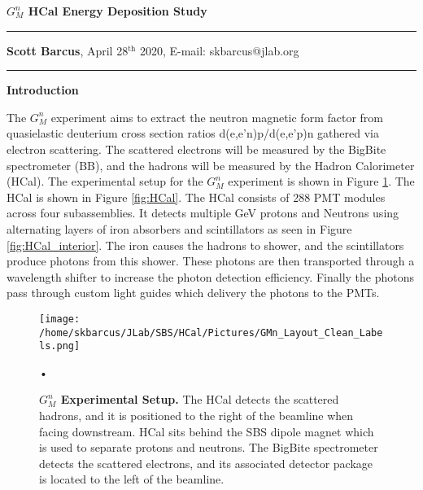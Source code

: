 \documentclass[10pt]{article}
\date{}
\begin{document}
\begin{flushleft}
{\Large
\textbf{$G_M^n$ HCal Energy Deposition Study}
}
\\
\vspace{4mm}
\hrule height 0.8pt \relax
\vspace{2mm}
\textbf{Scott Barcus}, April 28$^{\text{th}}$ 2020, E-mail: skbarcus@jlab.org
\end{flushleft}
\vspace{-2mm}
\hrule height 0.8pt \relax
\vspace{6mm}

\setlength{\parindent}{0.5cm}


{\large \noindent \bf{Introduction}}
\vspace{3mm}

The $G_M^n$ experiment aims to extract the neutron magnetic form factor from quasielastic deuterium cross section ratios d(e,e'n)p/d(e,e'p)n gathered via electron scattering. The scattered electrons will be measured by the BigBite spectrometer (BB), and the hadrons will be measured by the Hadron Calorimeter (HCal). The experimental setup for the $G_M^n$ experiment is shown in Figure \ref{fig:gmn_setup}. The HCal is shown in Figure \ref{fig:HCal}. The HCal consists of 288 PMT modules across four subassemblies. It detects multiple GeV protons and Neutrons using alternating layers of iron absorbers and scintillators as seen in Figure \ref{fig:HCal_interior}. The iron causes the hadrons to shower, and the scintillators produce photons from this shower. These photons are then transported through a wavelength shifter to increase the photon detection efficiency. Finally the photons pass through custom light guides which delivery the photons to the PMTs. 
\vspace{3mm}

	\begin{figure}[!ht]
	\begin{center}
	\texttt{[image: /home/skbarcus/JLab/SBS/HCal/Pictures/GMn\_Layout\_Clean\_Labels.png]}
	\end{center}
	\caption{
	{\bf{$G_M^n$ Experimental Setup.}} The HCal detects the scattered hadrons, and it is positioned to the right of the beamline when facing downstream. HCal sits behind the SBS dipole magnet which is used to separate protons and neutrons. The BigBite spectrometer detects the scattered electrons, and its associated detector package is located to the left of the beamline.}
\begin{flushleft}
	•
	\end{flushleft}	\label{fig:gmn_setup}
	\end{figure}	
	
\end{document}
